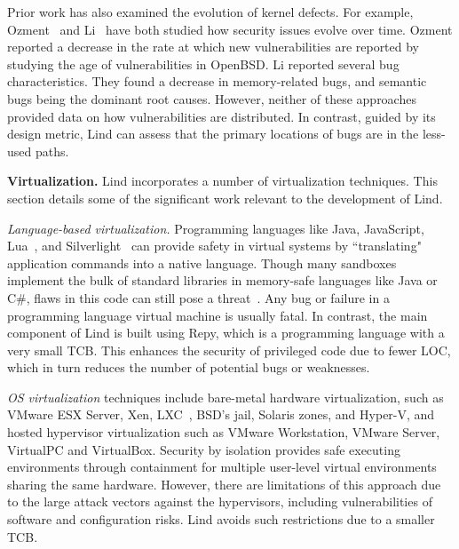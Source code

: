 Prior work has also examined the evolution of kernel defects. For example,
Ozment~\cite{ozment2006milk} and Li~\cite{li2006have} have
both studied how security issues evolve over
time. Ozment reported a decrease in the rate at which new vulnerabilities
are reported by studying the age of vulnerabilities in OpenBSD. 
Li reported several bug characteristics. They found a decrease in memory-related 
bugs, and semantic bugs being the dominant root causes.  
However, neither of these approaches provided data
on how vulnerabilities are distributed.
In contrast, guided by its design metric, Lind can assess that the primary locations
of bugs are in the less-used paths.


\textbf{Virtualization.}
Lind incorporates a number of virtualization techniques. This section details some
of the significant work relevant to the development of Lind.

\textit{Language-based virtualization.}
Programming languages like Java, JavaScript, Lua~\cite{Lua}, and
Silverlight~\cite{Silverlight} can provide safety in virtual systems by
``translating" application commands into a native language.
%
Though many sandboxes implement the bulk of standard libraries in
memory-safe languages like Java or C\#, flaws in this code can
still pose a threat~\cite{JavaBugs, Java-Lessons}.
Any bug or failure in a programming language virtual
machine is usually fatal. In contrast, the main component of Lind 
is built using Repy, which is a programming language with a very small TCB. 
This enhances the security of privileged code due to fewer LOC,  which in
turn reduces the number of potential bugs or weaknesses. 

\textit{OS virtualization}
techniques include
bare-metal hardware virtualization, such as VMware ESX Server, Xen,
LXC~\cite{LXC}, BSD's jail, Solaris zones, and Hyper-V, and
hosted hypervisor virtualization such as VMware
Workstation, VMware Server, VirtualPC and VirtualBox.
Security by isolation \cite{Qubes, Overshadow, SecureVM, HypSec}
provides safe executing environments through containment for multiple
user-level virtual environments sharing the same hardware.
However, there are limitations of this approach due to
the large attack vectors against the hypervisors, including
vulnerabilities of software and configuration risks. Lind avoids such restrictions due to a smaller TCB.

